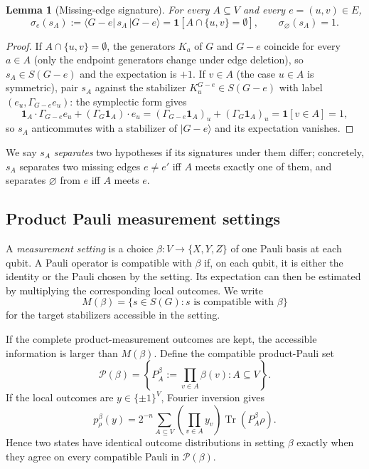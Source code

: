 \documentclass[11pt]{article}
\newtheorem{lemma}[theorem]{Lemma}
\theoremstyle{remark}
\newcommand{\Tr}{\operatorname{Tr}}
\begin{document}
\begin{lemma}[Missing-edge signature]\label{lem:sig}
For every $A\subseteq V$ and every $e=(u,v)\in E$,
\[
\sigma_e(s_A):=\langle G-e|\,s_A\,|G-e\rangle=\mathbf 1\!\left[A\cap\{u,v\}=\emptyset\right],
\qquad
\sigma_\varnothing(s_A)=1 .
\]
\end{lemma}

\begin{proof}
If $A\cap\{u,v\}=\emptyset$, the generators $K_a$ of $G$ and $G-e$ coincide for every $a\in A$ (only the endpoint generators change under edge deletion), so $s_A\in S(G-e)$ and the expectation is $+1$. If $v\in A$ (the case $u\in A$ is symmetric), pair $s_A$ against the stabilizer $K_u^{G-e}\in S(G-e)$ with label $(e_u,\Gamma_{G-e}e_u)$: the symplectic form gives
\[
\mathbf 1_A\cdot\Gamma_{G-e}e_u+(\Gamma_G\mathbf 1_A)\cdot e_u
=(\Gamma_{G-e}\mathbf 1_A)_u+(\Gamma_G\mathbf 1_A)_u
=\mathbf 1[v\in A]=1,
\]
so $s_A$ anticommutes with a stabilizer of $|G-e\rangle$ and its expectation vanishes.
\end{proof}

We say $s_A$ \emph{separates} two hypotheses if its signatures under them differ; concretely, $s_A$ separates two missing edges $e\neq e'$ iff $A$ meets exactly one of them, and separates $\varnothing$ from $e$ iff $A$ meets $e$.

\subsection{Product Pauli measurement settings}
A \emph{measurement setting} is a choice \(\beta:V\to\{X,Y,Z\}\) of one Pauli basis at each qubit.  A Pauli operator is compatible with \(\beta\) if, on each qubit, it is either the identity or the Pauli chosen by the setting.  Its expectation can then be estimated by multiplying the corresponding local outcomes.  We write
\[
M(\beta)=\{s\in S(G): s\text{ is compatible with }\beta\}
\]
for the target stabilizers accessible in the setting.

If the complete product-measurement outcomes are kept, the accessible information is larger than \(M(\beta)\).  Define the compatible product-Pauli set
\[
\mathcal P(\beta)=\left\{P_A^\beta:=\prod_{v\in A}\beta(v):A\subseteq V\right\}.
\]
If the local outcomes are $y\in\{\pm1\}^V$, Fourier inversion gives
\begin{equation}\label{eq:rawfourier}
 p_\rho^\beta(y)=2^{-n}\sum_{A\subseteq V}\left(\prod_{v\in A}y_v\right)\Tr(P_A^\beta\rho).
\end{equation}
Hence two states have identical outcome distributions in setting $\beta$ exactly when they agree on every compatible Pauli in $\mathcal P(\beta)$.
\end{document}
